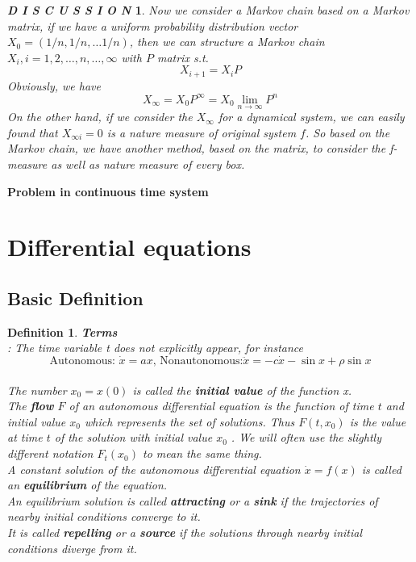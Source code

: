 \documentclass[12pt]{article}
\theoremstyle{plain}
\newtheorem{definition}{{\color{red}\textbf{Definition}}}[section]
\newtheorem{discussion}{\textit{D I S C U S S I O N}}[section]
\begin{document}
\begin{discussion}
Now we consider a Markov chain based on a Markov matrix, if we have a uniform probability distribution vector $X_0 = (1/n, 1/n, \ldots 1/n)$, then we can structure a Markov chain $X_i, i = 1, 2,\ldots, n, \ldots, \infty$ with $P$ matrix s.t. 
$$
X_{i+1} = X_iP
$$
Obviously, we have 
$$
X_{\infty} = X_0 P^\infty = X_0 \lim_{n\rightarrow \infty}P^n
$$
On the other hand, if we consider the $X_\infty$ for a dynamical system, we can easily found that $X_{\infty i} = 0$ is a nature measure of original system $f$. So based on the Markov chain, we have another method, based on the matrix, to consider the f-measure as well as nature measure of every box.
\end{discussion}







\newpage

{
\begin{center}
\LARGE \textbf{Problem in continuous time system}
\end{center}
}
\section{Differential equations}
\subsection{Basic Definition}
\begin{definition}\textbf{Terms}
\\: The time variable t does not explicitly appear, for instance
$$
\text{Autonomous: }\dot x = ax \text{, Nonautonomous:} \ddot x = -c\dot x - \sin x + \rho \sin x
$$
\\ The number $x_0 = x(0)$ is called the \textbf{initial value} of the function x.
\\ The \textbf{flow} $F$ of an autonomous differential equation is the function of time $t$ and initial value $x_0$ which represents the set of solutions. Thus $F(t, x_0)$ is the value at time $t$ of the solution with initial value $x_0$ . We will often use the slightly different notation $F_t(x_0)$ to mean the same thing.
\\ A constant solution of the autonomous differential equation $\dot x = f(x)$ is called an \textbf{equilibrium} of the equation.
\\ An equilibrium solution is called \textbf{attracting} or a \textbf{sink} if the trajectories of nearby initial conditions converge to it.
\\ It is called \textbf{repelling} or a \textbf{source} if the solutions through nearby initial conditions diverge from it. 
\end{definition}
\end{document}
